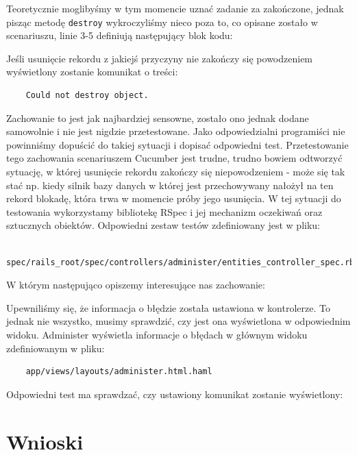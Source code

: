  	Teoretycznie moglibyśmy w tym momencie uznać zadanie za zakończone, jednak pisząc metodę \verb+destroy+ wykroczyliśmy nieco poza to, co opisane zostało w scenariuszu, linie 3-5 definiują następujący blok kodu:
 	
 	
 	
 	Jeśli usunięcie rekordu z jakiejś przyczyny nie zakończy się powodzeniem wyświetlony zostanie komunikat o treści:
 	
 	\begin{lstlisting}
 	Could not destroy object.
 	\end{lstlisting}
 	
 	Zachowanie to jest jak najbardziej sensowne, zostało ono jednak dodane samowolnie i nie jest nigdzie przetestowane. Jako odpowiedzialni programiści nie powinniśmy dopuścić do takiej sytuacji i dopisać odpowiedni test. Przetestowanie tego zachowania scenariuszem Cucumber jest trudne, trudno bowiem odtworzyć sytuację, w której usunięcie rekordu zakończy się niepowodzeniem - może się tak stać np. kiedy silnik bazy danych w której jest przechowywany nałożył na ten rekord blokadę, która trwa w momencie próby jego usunięcia. W tej sytuacji do testowania wykorzystamy bibliotekę RSpec i jej mechanizm oczekiwań oraz sztucznych obiektów. Odpowiedni zestaw testów zdefiniowany jest w pliku:
 	
 	\begin{lstlisting}
 	spec/rails_root/spec/controllers/administer/entities_controller_spec.rb
 	\end{lstlisting}
 	
 	W którym następująco opiszemy interesujące nas zachowanie:
 	
 	
 	
 	Upewniliśmy się, że informacja o błędzie została ustawiona w kontrolerze. To jednak nie wszystko, musimy sprawdzić, czy jest ona wyświetlona w odpowiednim widoku. Administer wyświetla informacje o błędach w głównym widoku zdefiniowanym w pliku:
 	
 	\begin{lstlisting}
 	app/views/layouts/administer.html.haml
 	\end{lstlisting}
 	
 	Odpowiedni test ma sprawdzać, czy ustawiony komunikat zostanie wyświetlony:
 	
 	
  
  
  \section{Wnioski}
